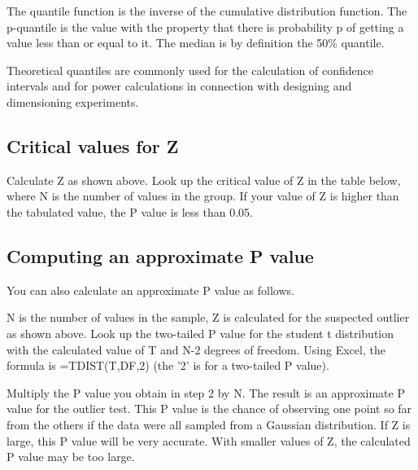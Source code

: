 The quantile function is the inverse of the cumulative
distribution function. The p-quantile is the value with the
property that there is probability p of getting a value less than
or equal to it. The median is by definition the 50\% quantile.

Theoretical quantiles are commonly used for the calculation of
confidence intervals and for power calculations in connection with
designing and dimensioning experiments.


\subsection{Critical values for Z}

Calculate Z as shown above. Look up the critical value of Z in the table below, where N is the number of values in the group. If your value of Z is higher than the tabulated value, the P value is less than 0.05.

\subsection{Computing an approximate P value}

You can also calculate an approximate P value as follows.


N is the number of values in the sample, Z is calculated for the suspected outlier as shown above.
Look up the two-tailed P value for the student t distribution with the calculated value of T and N-2 degrees of freedom. Using Excel, the formula is =TDIST(T,DF,2) (the '2' is for a two-tailed P value).


Multiply the P value you obtain in step 2 by N. The result is an approximate P value for the outlier test. This P value is the chance of observing one point so far from the others if the data were all sampled from a Gaussian distribution. If Z is large, this P value will be very accurate. With smaller values of Z, the calculated P value may be too large.





